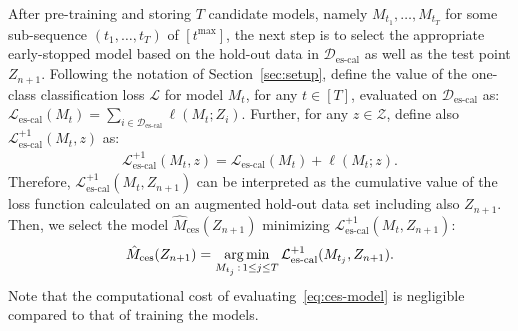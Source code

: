 After pre-training and storing $T$ candidate models, namely $M_{t_1}, \ldots, M_{t_T}$ for some sub-sequence $(t_1, \ldots, t_T)$ of $[t^{\text{max}}]$, the next step is to select the appropriate early-stopped model based on the hold-out data in $\mathcal{D}_{\text{es-cal}}$ as well as the test point $Z_{n+1}$.
Following the notation of Section~\ref{sec:setup}, define the value of the one-class classification loss $\mathcal{L}$ for model $M_t$, for any $t \in [T]$, evaluated on $\mathcal{D}_{\text{es-cal}}$ as: $\mathcal{L}_{\text{es-cal}}(M_t) = \sum_{i \in \mathcal{D}_{\text{es-cal}}} \ell(M_t; Z_i)$.
Further, for any $z \in \mathcal{Z}$, define also $\mathcal{L}_{\text{es-cal}}^{+1}(M_t,z)$ as:
\begin{align} \label{eq:loss-ces}
\mathcal{L}_{\text{es-cal}}^{+1}(M_t,z) = \mathcal{L}_{\text{es-cal}}(M_t) + \ell(M_t; z).
\end{align}
Therefore, $\mathcal{L}_{\text{es-cal}}^{+1}(M_t,Z_{n+1})$ can be interpreted as the cumulative value of the loss function calculated on an augmented hold-out data set including also $Z_{n+1}$.
Then, we select the model $\hat{M}_{\text{ces}}(Z_{n+1})$ minimizing $\mathcal{L}_{\text{es-cal}}^{+1}(M_t,Z_{n+1})$:
\begin{align} \label{eq:ces-model}
\hat{M}_{\text{ces}}(Z_{n+1}) = \operatorname*{arg\,min}_{M_{t_j} \, : \, 1 \leq j \leq T} \mathcal{L}_{\text{es-cal}}^{+1}(M_{t_j},Z_{n+1}).
\end{align}
Note that the computational cost of evaluating~\eqref{eq:ces-model} is negligible compared to that of training the models.

